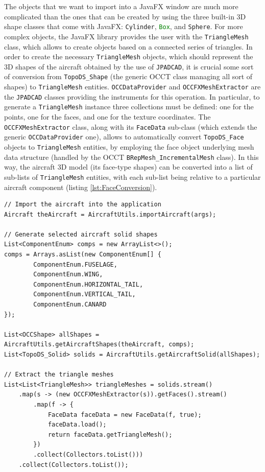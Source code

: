 \bigskip
\noindent
The objects that we want to import into a JavaFX window are much more complicated than the ones that can be created by using the three built-in 3D shape classes that come with JavaFX: \lstinline[language=Java]!Cylinder!, \lstinline[language=Java]!Box!, and \lstinline[language=Java]!Sphere!. For more complex objects, the JavaFX library provides the user with the \lstinline[language=Java]!TriangleMesh! class, which allows to create objects based on a connected series of triangles. In order to create the necessary \lstinline[language=Java]!TriangleMesh! objects, which should represent the 3D shapes of the aircraft obtained by the use of \lstinline[language=Java]!JPADCAD!, it is crucial some sort of conversion from \lstinline[language=Java]!TopoDS_Shape! (the generic \gls{OCCT} class managing all sort of shapes) to \lstinline[language=Java]!TriangleMesh! entities. \lstinline[language=Java]!OCCDataProvider! and \lstinline[language=Java]!OCCFXMeshExtractor! are the \lstinline[language=Java]!JPADCAD! classes providing the instruments for this operation. In particular, to generate a \lstinline[language=Java]!TriangleMesh! instance three collections must be defined: one for the points, one for the faces, and one for the texture coordinates. The \lstinline[language=Java]!OCCFXMeshExtractor! class, along with its \lstinline[language=Java]!FaceData! sub-class (which extends the generic \lstinline[language=Java]!OCCDataProvider! one), allows to automatically convert \lstinline[language=Java]!TopoDS_Face! objects to \lstinline[language=Java]!TriangleMesh! entities, by employing the face object underlying mesh data structure (handled by the \gls{OCCT} \lstinline[language=Java]!BRepMesh_IncrementalMesh! class). In this way, the aircraft 3D model (its face-type shapes) can be converted into a list of sub-lists of \lstinline[language=Java]!TriangleMesh! entities, with each sub-list being relative to a particular aircraft component (listing \ref{lst:FaceConversion}).
%
\bigskip
\begin{lstlisting}[caption={Solid shapes conversion to JavaFX triangle meshes}, captionpos=b, tabsize=2, label={lst:FaceConversion}]
// Import the aircraft into the application
Aircraft theAircraft = AircraftUtils.importAircraft(args);

// Generate selected aircraft solid shapes
List<ComponentEnum> comps = new ArrayList<>();
comps = Arrays.asList(new ComponentEnum[] {
		ComponentEnum.FUSELAGE, 
		ComponentEnum.WING, 
		ComponentEnum.HORIZONTAL_TAIL, 
		ComponentEnum.VERTICAL_TAIL, 
		ComponentEnum.CANARD
});

List<OCCShape> allShapes = AircraftUtils.getAircraftShapes(theAircraft, comps);
List<TopoDS_Solid> solids = AircraftUtils.getAircraftSolid(allShapes);
		
// Extract the triangle meshes
List<List<TriangleMesh>> triangleMeshes = solids.stream()
	.map(s -> (new OCCFXMeshExtractor(s)).getFaces().stream()
		.map(f -> {
			FaceData faceData = new FaceData(f, true);
			faceData.load();
			return faceData.getTriangleMesh();
		})
		.collect(Collectors.toList()))
	.collect(Collectors.toList());
\end{lstlisting}
%

